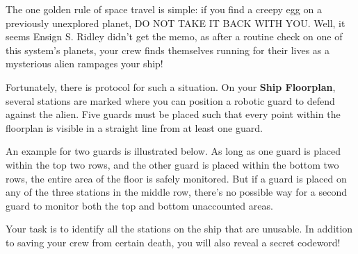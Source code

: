 The one golden rule of space travel is simple: if you find a creepy
egg on a previously unexplored planet, DO NOT TAKE IT BACK WITH YOU.
Well, it seems Ensign S. Ridley didn't get the memo, as after
a routine check on one of this system's planets, your crew finds
themselves running for their lives as a mysterious alien
rampages your ship!

Fortunately, there is protocol for such a situation. On your
\textbf{Ship Floorplan}, several stations are marked where you
can position a robotic guard to defend against the alien. 
Five guards must be placed such that every point within the floorplan
is visible in a straight line from at least one guard.

An example for two guards is illustrated below. As long as one
guard is placed within the top two rows, and the other guard is
placed within the bottom two rows, the entire area of the floor
is safely monitored. But if a guard is placed on any of the
three stations in the middle row,
there's no possible way for a second guard to monitor both
the top and bottom unaccounted areas.

Your task is to identify all the stations on the ship that
are unusable. In addition to saving your crew from
certain death, you will also reveal a secret codeword!

